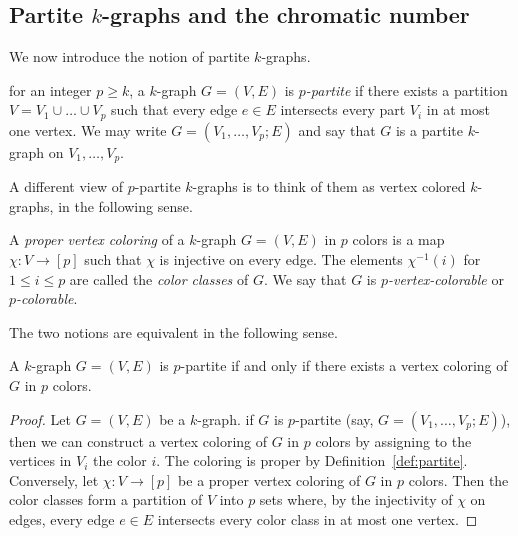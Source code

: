 \subsection{Partite $k$-graphs and the chromatic number}\label{subsec:partite}

We now introduce the notion of partite $k$-graphs.

\begin{definition} \label{def:partite}
    for an integer $p \geq k$, a $k$-graph $G = (V, E)$ is \emph{$p$-partite}
    if there exists a partition $V = V_1 \cup \dots \cup V_p$
    such that every edge $e \in E$ intersects every part $V_i$ in at most one vertex.
    We may write $G = (V_1, \dots, V_p; E)$ and say that
    $G$ is a partite $k$-graph on $V_1, \dots, V_p$.
\end{definition}

A different view of $p$-partite $k$-graphs is to think of them as vertex colored $k$-graphs,
in the following sense.

\begin{definition}
    A \emph{proper vertex coloring} of a $k$-graph $G = (V, E)$ in $p$ colors
    is a map $\chi: V \to [p]$ such that $\chi$ is injective on every edge.
    The elements $\chi^{-1}(i)$ for $1 \leq i \leq p$ are called the \emph{color classes} of $G$.
    We say that $G$ is \emph{$p$-vertex-colorable} or \emph{$p$-colorable}.
\end{definition}

The two notions are equivalent in the following sense.

\begin{proposition}
    A $k$-graph $G = (V, E)$ is $p$-partite if and only if
    there exists a vertex coloring of $G$ in $p$ colors.
    \begin{proof}
        Let $G = (V, E)$ be a $k$-graph.
        if $G$ is $p$-partite (say, $G = (V_1, \dots, V_p; E)$),
        then we can construct a vertex coloring of $G$ in $p$ colors
        by assigning to the vertices in $V_i$ the color $i$.
        The coloring is proper by Definition~\ref{def:partite}.
        Conversely, let $\chi: V \to [p]$ be a proper vertex coloring of $G$ in $p$ colors.
        Then the color classes form a partition of $V$ into $p$ sets where, by the injectivity of $\chi$ on edges,
        every edge $e \in E$ intersects every color class in at most one vertex.
    \end{proof}
\end{proposition}

